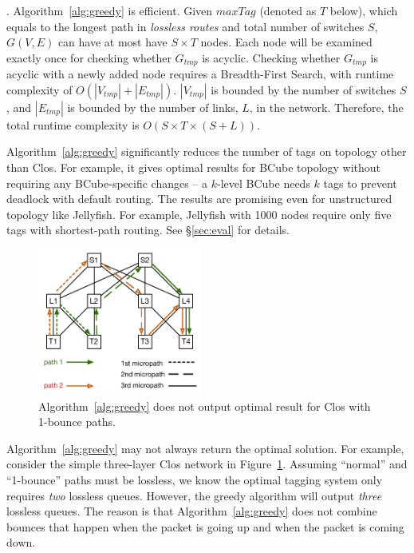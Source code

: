 . Algorithm~\ref{alg:greedy} is efficient. Given $maxTag$ 
(denoted as $T$ below), which equals to the longest path in {\em lossless routes} and
total number of switches $S$, $G(V,E)$ can have at most have $S \times T$ nodes.
Each node will be examined exactly once for checking whether $G_{tmp}$ is acyclic.
Checking whether $G_{tmp}$ is acyclic with a newly added node requires a Breadth-First Search,
with runtime complexity of $O(|V_{tmp}| + |E_{tmp}|)$. $|V_{tmp}|$ is bounded by the number
of switches $S$, and $|E_{tmp}|$ is bounded by the number of links, $L$, in the network.
Therefore, the total runtime complexity is $O(S \times T \times (S+L))$.

 Algorithm~\ref{alg:greedy} significantly reduces the
number of tags on topology other than Clos. For example, it gives optimal
results for BCube topology without requiring any BCube-specific changes -- a
$k$-level BCube needs $k$ tags to prevent deadlock with default routing. The
results are promising even for unstructured topology like Jellyfish.  For
example, Jellyfish with 1000 nodes require only five tags with shortest-path
routing. See \S\ref{sec:eval} for details.

\begin{figure}[t]
	\centering
	\includegraphics[width=0.48\textwidth] {figs/nonoptimal_example}
	\caption{Algorithm~\ref{alg:greedy} does not output optimal result for Clos with 1-bounce paths.}
	\label{fig:nonoptimal}
\end{figure}

Algorithm~\ref{alg:greedy} may not always return the optimal solution. For example, 
consider the simple three-layer Clos network in Figure~\ref{fig:nonoptimal}. 
Assuming ``normal'' and ``1-bounce'' paths must be lossless,  
we know the optimal tagging system only requires {\em two} lossless queues. However, the 
greedy algorithm will output {\em three} lossless queues. The reason is that 
Algorithm~\ref{alg:greedy} does not combine bounces that happen when the packet is going up
and when the packet is coming down. 

